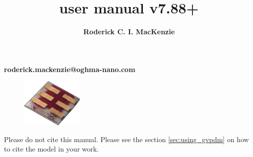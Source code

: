 \title{\Huge \textbf{\simname user manual v7.88+}}

\author{\textbf{Roderick C. I. MacKenzie}}


\maketitle



\setcounter{question}{0}



\centerline{\textbf{roderick.mackenzie@oghma-nano.com}}



\begin{figure}[ht!]
\centering
\includegraphics[width=30mm]{./images/cell.jpg}
\label{overflow}
\end{figure}

\newpage


\vspace*{\fill}
Please do not cite this manual.  Please see the section \ref{sec:using_gvpdm} on how to cite the model in your work.
\vspace*{\fill}


